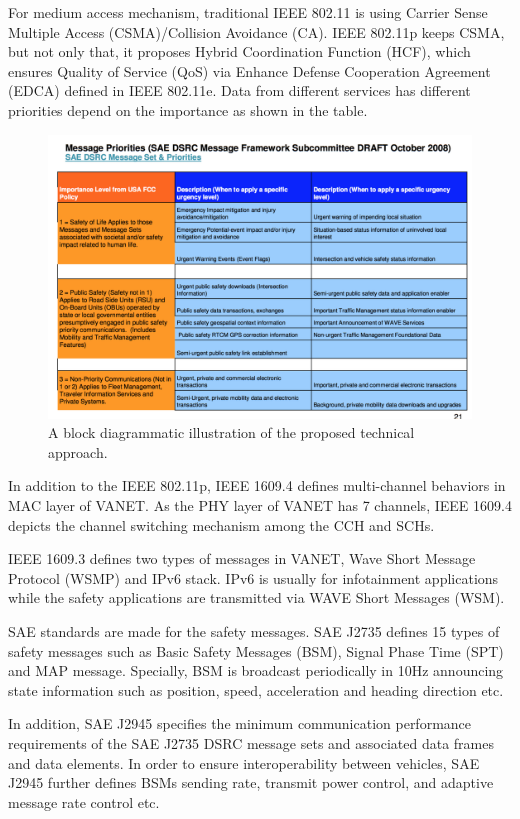For medium access mechanism, traditional IEEE 802.11 is using Carrier Sense Multiple Access (CSMA)/Collision Avoidance (CA). IEEE 802.11p keeps CSMA, but not only that, it proposes Hybrid Coordination Function (HCF), which ensures Quality of Service (QoS) via Enhance Defense Cooperation Agreement (EDCA) defined in IEEE 802.11e. Data from different services has different priorities depend on the importance as shown in the table. 

\begin{figure}[h!]
	\centering
	\includegraphics[width=0.7\columnwidth]{figures/msg_priority.png}
	\caption{A block diagrammatic illustration of the proposed technical approach.}
	\label{fig-project-block}
\end{figure}



In addition to the IEEE 802.11p, IEEE 1609.4 defines multi-channel behaviors in MAC layer of VANET. As the PHY layer of VANET has 7 channels, IEEE 1609.4 depicts the channel switching mechanism among the CCH and SCHs. 

IEEE 1609.3 defines two types of messages in VANET, Wave Short Message Protocol (WSMP) and IPv6 stack. IPv6 is usually for infotainment applications while the safety applications are transmitted via WAVE Short Messages (WSM). 

SAE standards are made for the safety messages. SAE J2735 defines 15 types of safety messages such as Basic Safety Messages (BSM), Signal Phase Time (SPT) and MAP message. Specially, BSM is broadcast periodically in 10Hz announcing state information such as position, speed, acceleration and heading direction etc. 

In addition, SAE J2945 specifies the minimum communication performance requirements of the SAE J2735 DSRC message sets and associated data frames and data elements. In order to ensure interoperability between vehicles, SAE J2945 further defines BSMs sending rate, transmit power control, and adaptive message rate control etc. 


